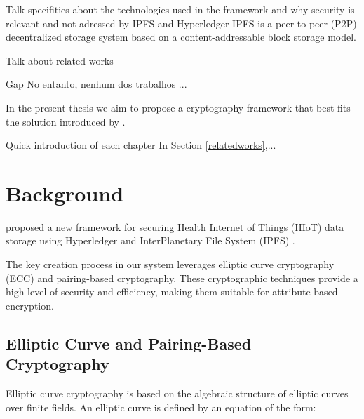 \documentclass[cic,tc,english]{iiufrgs}
\begin{document}
    \begin{draft}{Talk specifities about the technologies used in the framework and why security is relevant and not adressed by IPFS and Hyperledger}
        IPFS \cite{benet2013ipfs} is a peer-to-peer (P2P) decentralized storage system based on a content-addressable block storage model.
    \end{draft}

    \begin{draft}{Talk about related works}
        
    \end{draft}

    \begin{draft}{Gap}
        No entanto, nenhum dos trabalhos ...
    \end{draft}


    In the present thesis we aim to propose a cryptography framework that best fits the solution introduced by \citet{laura2023}.


    \begin{draft}{Quick introduction of each chapter}
        In Section \ref{relatedworks},...

    \end{draft}

\chapter{Background}
    \label{chap:background}
    \citet{laura2023} proposed a new framework for securing Health Internet of Things (HIoT) data storage using Hyperledger and InterPlanetary File System (IPFS) \cite{benet2013ipfs}.

    The key creation process in our system leverages elliptic curve cryptography (ECC) and pairing-based cryptography. These cryptographic techniques provide a high level of security and efficiency, making them suitable for attribute-based encryption.

    \section{Elliptic Curve and Pairing-Based Cryptography}
        \label{sec:ecc}
        Elliptic curve cryptography is based on the algebraic structure of elliptic curves over finite fields. An elliptic curve is defined by an equation of the form:
\end{document}
